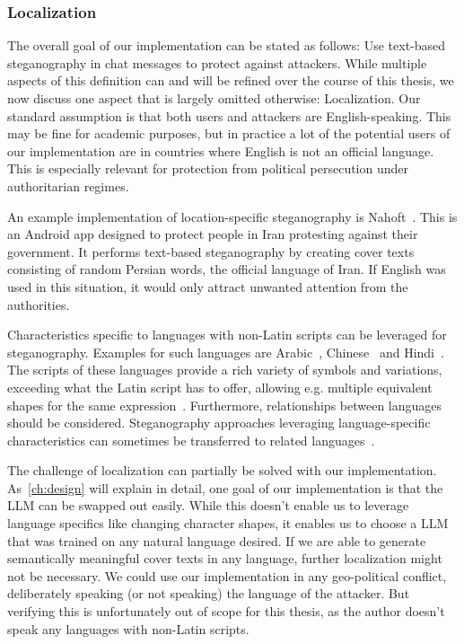 \subsubsection{Localization}
\label{sec:localization}
The overall goal of our implementation can be stated as follows: Use text-based steganography in chat messages to protect against attackers. While multiple aspects of this definition can and will be refined over the course of this thesis, we now discuss one aspect that is largely omitted otherwise: Localization. Our standard assumption is that both users and attackers are English-speaking. This may be fine for academic purposes, but in practice a lot of the potential users of our implementation are in countries where English is not an official language. This is especially relevant for protection from political persecution under authoritarian regimes.

An example implementation of location-specific steganography is Nahoft~\cite{united4iranNahoft2021,united4iranU4iadminNahoft2025}. This is an Android app designed to protect people in Iran protesting against their government. It performs text-based steganography by creating cover texts consisting of random Persian words, the official language of Iran. If English was used in this situation, it would only attract unwanted attention from the authorities.

Characteristics specific to languages with non-Latin scripts can be leveraged for steganography. Examples for such languages are Arabic~\cite{shirali-shahrezaNewApproachPersian2006,hamzahLinguisticSteganographyFramework2021,thabitComparativeAnalysisArabic2021}, Chinese~\cite{luoTextSteganographyHigh2017} and Hindi~\cite{allaEvolutionHindiText2009}. The scripts of these languages provide a rich variety of symbols and variations, exceeding what the Latin script has to offer, allowing e.g. multiple equivalent shapes for the same expression~\cite{shirali-shahrezaNewApproachPersian2006,hamzahLinguisticSteganographyFramework2021,thabitComparativeAnalysisArabic2021}. Furthermore, relationships between languages should be considered. Steganography approaches leveraging language-specific characteristics can sometimes be transferred to related languages~\cite{allaEvolutionHindiText2009}.

The challenge of localization can partially be solved with our implementation. As~\cref{ch:design} will explain in detail, one goal of our implementation is that the \gls{LLM} can be swapped out easily. While this doesn't enable us to leverage language specifics like changing character shapes, it enables us to choose a \gls{LLM} that was trained on any natural language desired. If we are able to generate semantically meaningful cover texts in any language, further localization might not be necessary. We could use our implementation in any geo-political conflict, deliberately speaking (or not speaking) the language of the attacker. But verifying this is unfortunately out of scope for this thesis, as the author doesn't speak any languages with non-Latin scripts.

